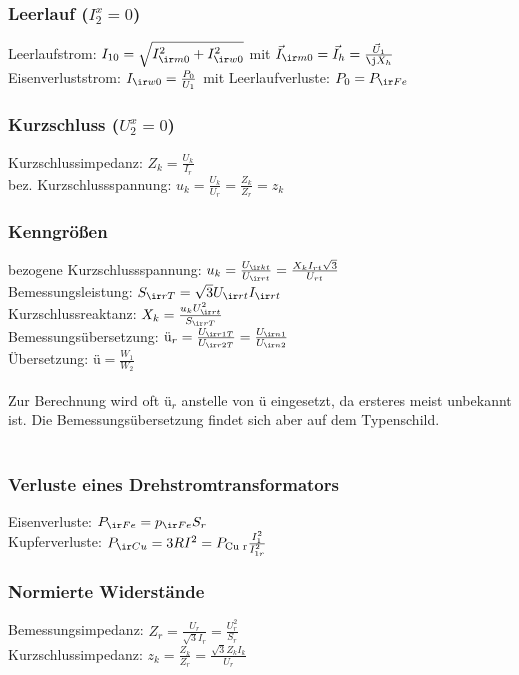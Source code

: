 \documentclass[european]{latex4ei_sheet}
\begin{document}
		\subsubsection{Leerlauf ($I_2^x =0$)}
		Leerlaufstrom: $I_{10} = \sqrt{I_{\ir m0}^2+I_{\ir w0}^2}$ mit $\vec I_{\ir m0} = \vec I_h=\frac{\vec U_1}{\j X_h}$\\
		Eisenverluststrom: $I_{\ir w0} = \frac{P_0}{U_1}$ mit Leerlaufverluste: $P_0 = P_{\ir Fe}$
		\subsubsection{Kurzschluss ($U_2^x=0$)}	
		Kurzschlussimpedanz: $Z_k = \frac{U_k}{I_r}$\\
		bez. Kurzschlussspannung: $u_k = \frac{U_k}{U_r} = \frac{Z_k}{Z_r} = z_k$
		\subsubsection{Kenngrößen}
		bezogene Kurzschlussspannung: $u_k = \frac{U_{\ir kt}}{U_{\ir rt}} = \frac{X_kI_{rt}\sqrt{3}}{U_{rt}}$\\
		Bemessungsleistung: $S_{\ir rT} = \sqrt{3}U_{\ir rt}I_{\ir rt}$\\
		Kurzschlussreaktanz: $X_k = \frac{u_k U_{\ir rt}^2}{S_{\ir rT}}$\\
		Bemessungsübersetzung: $\textrm{ü}_r=\frac{U_{\ir r1T}}{U_{\ir r2T}} = \frac{U_{\ir n1}}{U_{\ir n2}}$\\
		Übersetzung: $\textrm{ü} = \frac{W_1}{W_2}$\\
		\\
		Zur Berechnung wird oft $\textrm{ü}_r$ anstelle von $\textrm{ü}$ eingesetzt, da ersteres meist unbekannt ist. Die Bemessungsübersetzung findet sich aber auf dem Typenschild. \\
		\\
		\subsubsection{Verluste eines Drehstromtransformators}
		Eisenverluste: $P_{\ir Fe} = p_{\ir Fe}S_r$\\
		Kupferverluste: $P_{\ir Cu} = 3RI^2 = P_{\text{Cu r}} \frac{I_1^2}{I_{1r}^2}$
		
		\subsubsection{Normierte Widerstände}
		Bemessungsimpedanz: $Z_r = \frac{U_r}{\sqrt{3}I_r}=\frac{U_r^2}{S_r}$\\
		Kurzschlussimpedanz: $z_k = \frac{Z_k}{Z_r}=\frac{\sqrt{3}Z_kI_k}{U_r}$
		
\end{document}
